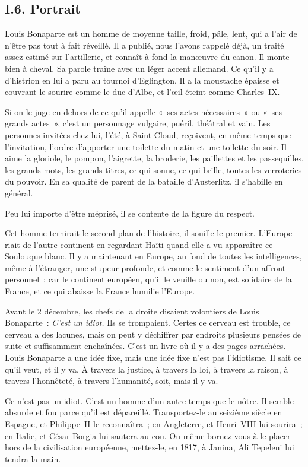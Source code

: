 \documentclass[french,twoside]{book} %
\begin{document}
\subsection[{I.6. Portrait}]{I.6. Portrait}
\noindent Louis Bonaparte est un homme de moyenne taille, froid, pâle, lent, qui a l’air de n’être pas tout à fait réveillé. Il a publié, nous l’avons rappelé déjà, un traité assez estimé sur l’artillerie, et connaît à fond la manœuvre du canon. Il monte bien à cheval. Sa parole traîne avec un léger accent allemand. Ce qu’il y a d’histrion en lui a paru au tournoi d’Eglington. Il a la moustache épaisse et couvrant le sourire comme le duc d’Albe, et l’œil éteint comme Charles IX.\par
Si on le juge en dehors de ce qu’il appelle « ses actes nécessaires » ou « ses grands actes », c’est un personnage vulgaire, puéril, théâtral et vain. Les personnes invitées chez lui, l’été, à Saint-Cloud, reçoivent, en même temps que l’invitation, l’ordre d’apporter une toilette du matin et une toilette du soir. Il aime la gloriole, le pompon, l’aigrette, la broderie, les paillettes et les passequilles, les grands mots, les grands titres, ce qui sonne, ce qui brille, toutes les verroteries du pouvoir. En sa qualité de parent de la bataille d’Austerlitz, il s’habille en général.\par
Peu lui importe d’être méprisé, il se contente de la figure du respect.\par
Cet homme ternirait le second plan de l’histoire, il souille le premier. L’Europe riait de l’autre continent en regardant Haïti quand elle a vu apparaître ce Soulouque blanc. Il y a maintenant en Europe, au fond de toutes les intelligences, même à l’étranger, une stupeur profonde, et comme le sentiment d’un affront personnel ; car le continent européen, qu’il le veuille ou non, est solidaire de la France, et ce qui abaisse la France humilie l’Europe.\par
Avant le 2 décembre, les chefs de la droite disaient volontiers de Louis Bonaparte : \emph{C’est un idiot.} Ils se trompaient. Certes ce cerveau est trouble, ce cerveau a des lacunes, mais on peut y déchiffrer par endroits plusieurs pensées de suite et suffisamment enchaînées. C’est un livre où il y a des pages arrachées. Louis Bonaparte a une idée fixe, mais une idée fixe n’est pas l’idiotisme. Il sait ce qu’il veut, et il y va. À travers la justice, à travers la loi, à travers la raison, à travers l’honnêteté, à travers l’humanité, soit, mais il y va.\par
Ce n’est pas un idiot. C’est un homme d’un autre temps que le nôtre. Il semble absurde et fou parce qu’il est dépareillé. Transportez-le au seizième siècle en Espagne, et Philippe II le reconnaîtra ; en Angleterre, et Henri VIII lui sourira ; en Italie, et César Borgia lui sautera au cou. Ou même bornez-vous à le placer hors de la civilisation européenne, mettez-le, en 1817, à Janina, Ali Tepeleni lui tendra la main.\par
\end{document}
